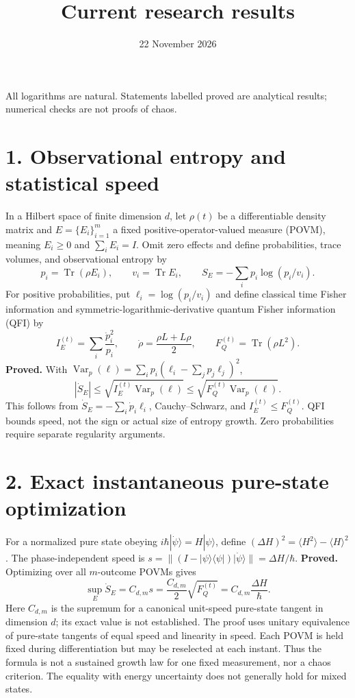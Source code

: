 \documentclass[11pt,a4paper]{article}
\DeclareMathOperator{\Tr}{Tr}
\DeclareMathOperator{\Var}{Var}
\begin{document}
\title{Current research results}
\author{}
\date{22 November 2026}
\maketitle
\noindent All logarithms are natural. Statements labelled proved are analytical results; numerical checks are not proofs of chaos.

\section*{1. Observational entropy and statistical speed}
In a Hilbert space of finite dimension $d$, let $\rho(t)$ be a differentiable density matrix and $E=\{E_i\}_{i=1}^m$ a fixed positive-operator-valued measure (POVM), meaning $E_i\geq0$ and $\sum_iE_i=I$. Omit zero effects and define probabilities, trace volumes, and observational entropy by
\[p_i=\Tr(\rho E_i),\qquad v_i=\Tr E_i,\qquad S_E=-\sum_i p_i\log(p_i/v_i).\]
For positive probabilities, put $\ell_i=\log(p_i/v_i)$ and define classical time Fisher information and symmetric-logarithmic-derivative quantum Fisher information (QFI) by
\[I_E^{(t)}=\sum_i\frac{\dot p_i^2}{p_i},\qquad \dot\rho=\frac{\rho L+L\rho}{2},\qquad F_Q^{(t)}=\Tr(\rho L^2).\]
\textbf{Proved.} With $\Var_p(\ell)=\sum_i p_i(\ell_i-\sum_jp_j\ell_j)^2$,
\[|\dot S_E|\leq\sqrt{I_E^{(t)}\Var_p(\ell)}\leq\sqrt{F_Q^{(t)}\Var_p(\ell)}.\]
This follows from $\dot S_E=-\sum_i\dot p_i\ell_i$, Cauchy--Schwarz, and $I_E^{(t)}\leq F_Q^{(t)}$. QFI bounds speed, not the sign or actual size of entropy growth. Zero probabilities require separate regularity arguments.

\section*{2. Exact instantaneous pure-state optimization}
For a normalized pure state obeying $i\hbar|\dot\psi\rangle=H|\psi\rangle$, define $(\Delta H)^2=\langle H^2\rangle-\langle H\rangle^2$. The phase-independent speed is $s=\|(I-|\psi\rangle\langle\psi|)|\dot\psi\rangle\|=\Delta H/\hbar$.
\textbf{Proved.} Optimizing over all $m$-outcome POVMs gives
\[\sup_E\dot S_E=C_{d,m}s=\frac{C_{d,m}}{2}\sqrt{F_Q^{(t)}}=C_{d,m}\frac{\Delta H}{\hbar}.\]
Here $C_{d,m}$ is the supremum for a canonical unit-speed pure-state tangent in dimension $d$; its exact value is not established. The proof uses unitary equivalence of pure-state tangents of equal speed and linearity in speed. Each POVM is held fixed during differentiation but may be reselected at each instant. Thus the formula is not a sustained growth law for one fixed measurement, nor a chaos criterion. The equality with energy uncertainty does not generally hold for mixed states.
\end{document}
